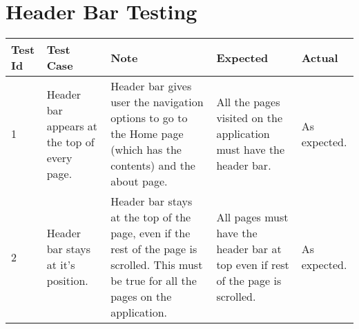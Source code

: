 \section{Header Bar Testing}
\begin{tabular}{ |p{1cm}|p{2cm}|p{4cm}|p{2cm}|p{2cm}| }
 \hline
 \textbf{Test Id} & \textbf{Test Case} & \textbf{Note} & \textbf{Expected} & \textbf{Actual} \\
 \hline
 1 
 & Header bar appears at the top of every page.
 & Header bar gives user the navigation options to go to the Home page (which has the contents)
   and the about page.
 & All the pages visited on the application must have the header bar.
 & As expected. \\
 \hline
 2 
 & Header bar stays at it's position.
 & Header bar stays at the top of the page, even if the rest of the page is scrolled.
 This must be true for all the pages on the application. 
 & All pages must have the header bar at top even if rest of the page is scrolled.
 & As expected. \\
 \hline
\end{tabular}


